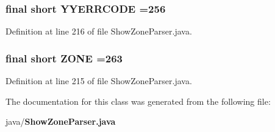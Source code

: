 \subsubsection[{Y\+Y\+E\+R\+R\+C\+O\+D\+E}]{\setlength{\rightskip}{0pt plus 5cm}final short Y\+Y\+E\+R\+R\+C\+O\+D\+E =256\hspace{0.3cm}{\ttfamily [static]}}\label{classorg_1_1smallfoot_1_1parser_1_1zone_1_1ShowZoneParser_a1c58472ea6621d2f613831e08d10dba3}


Definition at line 216 of file Show\+Zone\+Parser.\+java.

\subsubsection[{Z\+O\+N\+E}]{\setlength{\rightskip}{0pt plus 5cm}final short Z\+O\+N\+E =263\hspace{0.3cm}{\ttfamily [static]}}\label{classorg_1_1smallfoot_1_1parser_1_1zone_1_1ShowZoneParser_a8ddd6c0fce0f972519976a2c9ca1aadd}


Definition at line 215 of file Show\+Zone\+Parser.\+java.



The documentation for this class was generated from the following file\+:\begin{DoxyCompactItemize}
\item 
java/{\bf Show\+Zone\+Parser.\+java}\end{DoxyCompactItemize}
